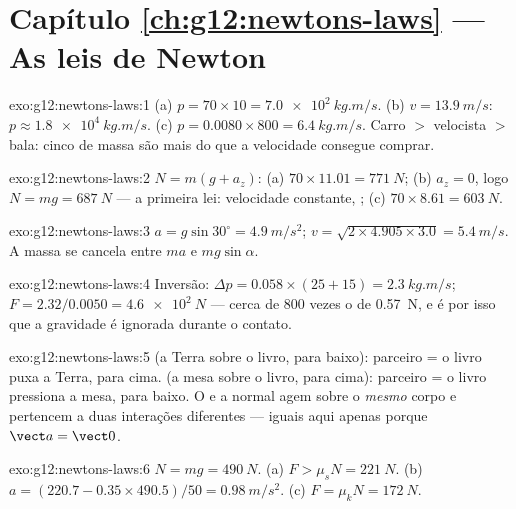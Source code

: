 \section*{Capítulo \ref{ch:g12:newtons-laws} --- As leis de Newton}

\begin{solution}{exo:g12:newtons-laws:1}
(a) $p = 70 \times 10 = \qty{7.0e2}{kg.m/s}$.
(b) $v = \qty{13.9}{m/s}$: $p \approx \qty{1.8e4}{kg.m/s}$.
(c) $p = 0.0080 \times 800 = \qty{6.4}{kg.m/s}$. Carro $>$ velocista $>$
bala: cinco  de massa são mais do que a velocidade
consegue comprar.
\end{solution}

\begin{solution}{exo:g12:newtons-laws:2}
$N = m(g + a_z)$: (a) $70 \times 11.01 = \qty{771}{N}$;
(b) $a_z = 0$, logo $N = mg = \qty{687}{N}$ --- a primeira lei:
velocidade constante, ; (c)
$70 \times 8.61 = \qty{603}{N}$.
\end{solution}

\begin{solution}{exo:g12:newtons-laws:3}
$a = g\sin 30^\circ = \qty{4.9}{m/s^2}$;
$v = \sqrt{2 \times 4.905 \times 3.0} = \qty{5.4}{m/s}$. A massa se
cancela entre $ma$ e $mg\sin\alpha$.
\end{solution}

\begin{solution}{exo:g12:newtons-laws:4}
Inversão: $\Delta p = 0.058 \times (25 + 15) = \qty{2.3}{kg.m/s}$;
$F = 2.32/0.0050 = \qty{4.6e2}{N}$ --- cerca de $800$ vezes o  de
\qty{0.57}{N}, e é por isso que a gravidade é ignorada durante o contato.
\end{solution}

\begin{solution}{exo:g12:newtons-laws:5}
 (a Terra sobre o livro, para baixo): parceiro = o livro puxa a
Terra, para cima.  (a mesa sobre o livro, para cima):
parceiro = o livro pressiona a mesa, para baixo. O  e a normal agem
sobre o \emph{mesmo} corpo e pertencem a duas interações diferentes ---
iguais aqui apenas porque $\vect a = \vect 0$.
\end{solution}

\begin{solution}{exo:g12:newtons-laws:6}
$N = mg = \qty{490}{N}$. (a) $F > \mu_s N = \qty{221}{N}$.
(b) $a = (220.7 - 0.35 \times 490.5)/50 = \qty{0.98}{m/s^2}$.
(c) $F = \mu_k N = \qty{172}{N}$.
\end{solution}

